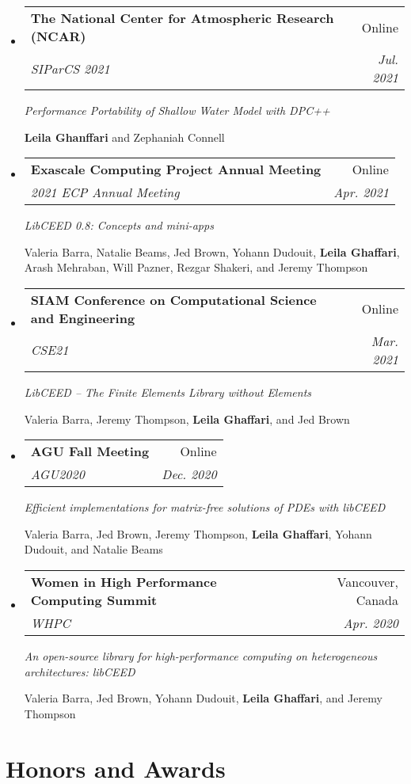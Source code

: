 \documentclass[letterpaper,11pt]{article}
\makeatletter
\newcommand{\resumeSubheading}[4]{
  \vspace{-1pt}\item
    \begin{tabular*}{0.97\textwidth}{l@{\extracolsep{\fill}}r}
      \textbf{#1} & #2 \\
      \textit{\small#3} & \textit{\small #4} \\
    \end{tabular*}\vspace{-5pt}
}
\newcommand{\resumeSubHeadingListStart}{\begin{itemize}[leftmargin=*]}
\newcommand{\resumeSubHeadingListEnd}{\end{itemize}}
\makeatother
\begin{document}
\resumeSubHeadingListStart

  \resumeSubheading
  {The National Center for Atmospheric Research (NCAR)}{Online}
  {SIParCS 2021}{Jul. 2021}
  \vspace{.1 mm}

  \emph{Performance Portability of Shallow Water Model with DPC++}

  \textbf{Leila Ghanffari} and Zephaniah Connell

  \resumeSubheading
  {Exascale Computing Project Annual Meeting}{Online}
  {2021 ECP Annual Meeting}{Apr. 2021}
  \vspace{.1 mm}

  \emph{LibCEED 0.8: Concepts and mini-apps}

  Valeria Barra, Natalie Beams, Jed Brown, Yohann Dudouit, \textbf{Leila Ghaffari}, Arash Mehraban, Will Pazner, Rezgar Shakeri, and Jeremy Thompson

  \resumeSubheading
  {SIAM Conference on Computational Science and Engineering}{Online}
  {CSE21}{Mar. 2021}
  \vspace{.1 mm}

  \emph{LibCEED – The Finite Elements Library without Elements}

  Valeria Barra, Jeremy Thompson, \textbf{Leila Ghaffari}, and Jed Brown

  \resumeSubheading
  {AGU Fall Meeting}{Online}
  {AGU2020}{Dec. 2020}
  \vspace{.1 mm}

  \emph{Efficient implementations for matrix-free solutions of PDEs with libCEED}

  Valeria Barra, Jed Brown, Jeremy Thompson, \textbf{Leila Ghaffari}, Yohann Dudouit, and Natalie Beams

  \resumeSubheading
  {Women in High Performance Computing Summit}{Vancouver, Canada}
  {WHPC}{Apr. 2020}
  \vspace{.1 mm}

  \emph{An open-source library for high-performance computing on heterogeneous architectures: libCEED}

  Valeria Barra, Jed Brown, Yohann Dudouit, \textbf{Leila Ghaffari}, and Jeremy Thompson


\resumeSubHeadingListEnd

\section{Honors and Awards}
\end{document}
